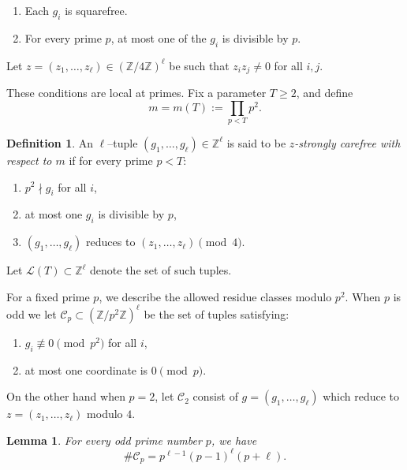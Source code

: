 \documentclass{amsart}
\newcommand{\Z}{\mathbb{Z}}
\theoremstyle{plain}
\newtheorem{lemma}[theorem]{Lemma}
\theoremstyle{definition}
\newtheorem{definition}[theorem]{Definition}
\theoremstyle{remark}
\numberwithin{equation}{section}
\begin{document}
\begin{enumerate}
\item[(i)] Each $g_i$ is squarefree.
\item[(ii)] For every prime $p$, at most one of the $g_i$ is divisible by $p$.
\end{enumerate}
Let $z=(z_1, \dots, z_\ell)\in (\Z/4\Z)^\ell$ be such that $z_i z_j\neq 0$ for all $i, j$. 

These conditions are local at primes.
Fix a parameter $T\geq 2$, and define
\[
m=m(T):=\prod_{p<T} p^2.
\]
\begin{definition}
An $\ell$–tuple $(g_1,\dots,g_\ell)\in \mathbb Z^\ell$
is said to be \emph{$z$-strongly carefree with respect to $m$}
if for every prime $p<T$:
\begin{enumerate}
\item[(i)] $p^2\nmid g_i$ for all $i$,
\item[(ii)] at most one $g_i$ is divisible by $p$,
\item[(iii)] $(g_1, \dots, g_\ell)$ reduces to $(z_1, \dots, z_\ell)\pmod{4}$. 
\end{enumerate}
\end{definition}
\noindent Let $\mathcal L(T)\subset \mathbb Z^\ell$ denote the set of such tuples.

\medskip

For a fixed prime $p$, we describe the allowed residue classes modulo $p^2$.
When $p$ is odd we let $\mathcal C_p\subset (\mathbb Z/p^2\mathbb Z)^\ell$ be the set of tuples satisfying:
\begin{enumerate}
\item[(i)] $g_i\not\equiv 0\pmod{p^2}$ for all $i$,
\item[(ii)] at most one coordinate is $0\pmod p$.
\end{enumerate}
\noindent On the other hand when $p=2$, let $\mathcal{C}_2$ consist of $g=(g_1, \dots, g_\ell)$ which reduce to $z=(z_1, \dots, z_\ell)$ modulo $4$.


\begin{lemma}\label{lemma:Cp-general}
For every odd prime number $p$, we have
\[
\#\mathcal C_p
=
p^{\ell-1}(p-1)^\ell (p+\ell).
\]
\end{lemma}
\end{document}
